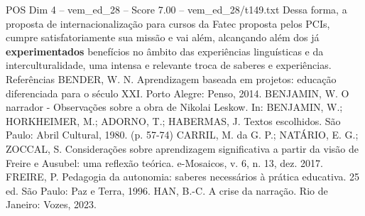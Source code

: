 \begin{textsample}{POS Dim 4 – vem\_ed\_28 – Score 7.00 – vem\_ed\_28/t149.txt}
Dessa forma, a proposta de internacionalização para cursos da Fatec proposta pelos PCIs, cumpre satisfatoriamente sua missão e vai além, alcançando além dos já \textbf{experimentados} benefícios no âmbito das experiências linguísticas e da interculturalidade, uma intensa e relevante troca de saberes e experiências.
Referências BENDER, W.
N.
Aprendizagem baseada em projetos: educação diferenciada para o século XXI.
Porto Alegre: Penso, 2014.
BENJAMIN, W.
O narrador - Observações sobre a obra de Nikolai Leskow.
In: BENJAMIN, W.; HORKHEIMER, M.; ADORNO, T.; HABERMAS, J.
Textos escolhidos.
São Paulo: Abril Cultural, 1980. (p. 57-74) CARRIL, M. da G.
P.; NATÁRIO, E.
G.; ZOCCAL, S.
Considerações sobre aprendizagem significativa a partir da visão de Freire e Ausubel: uma reflexão teórica. e-Mosaicos, v. 6, n. 13, dez. 2017.
FREIRE, P.
Pedagogia da autonomia: saberes necessários à prática educativa. 25 ed.
São Paulo: Paz e Terra, 1996.
HAN, B.-C.
A crise da narração.
Rio de Janeiro: Vozes, 2023.

\end{textsample}
